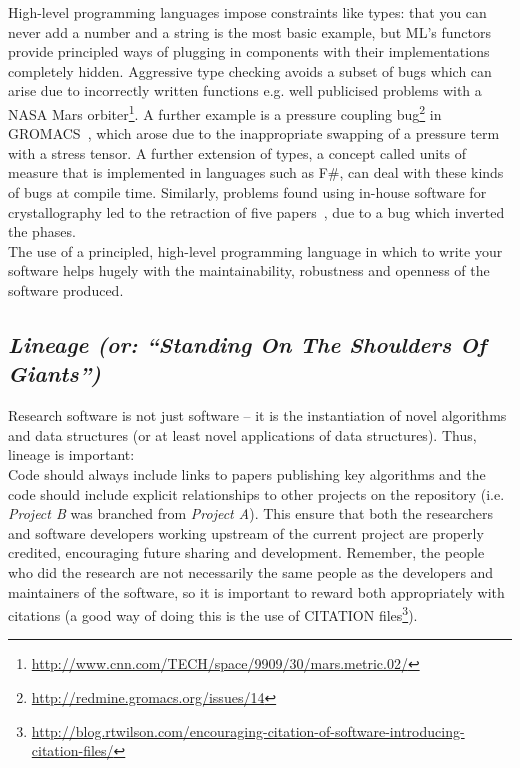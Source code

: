 \documentclass[a4paper,11pt]{article}
\begin{document}
High-level programming languages impose constraints like types: that
you can never add a number and a string is the most basic example, but
ML's functors provide principled ways of plugging in components with
their implementations completely hidden. Aggressive type checking
avoids a subset of bugs which can arise due to incorrectly written
functions e.g. well publicised problems with a NASA Mars
orbiter\footnote{\url{http://www.cnn.com/TECH/space/9909/30/mars.metric.02/}}.
A further example is a pressure coupling
bug\footnote{\url{http://redmine.gromacs.org/issues/14}} in
GROMACS~\cite{Hess2008}, which arose due to the inappropriate swapping
of a pressure term with a stress tensor.  A further extension of
types, a concept called units of measure that is implemented in
languages such as F\#, can deal with these kinds of bugs at compile
time. Similarly, problems found using in-house software for
crystallography led to the retraction of five
papers~\cite{Miller2006}, due to a bug which inverted the phases.\\

 The use of a
principled, high-level programming language in which to write your
software helps hugely with the maintainability, robustness and
openness of the software produced.

\subsection{{\emph{Lineage (or: ``Standing On The Shoulders Of Giants'')}}}

Research software is not just software -- it is the instantiation of
novel algorithms and data structures (or at least novel applications
of data structures). Thus, lineage is important:\\

 Code should always
include links to papers publishing key algorithms and the code should
include explicit relationships to other projects on the repository
(i.e. {\emph{Project B}} was branched from {\emph{Project A}}). This
ensure that both the researchers and software developers working
upstream of the current project are properly credited, encouraging
future sharing and development. Remember, the people who did the
research are not necessarily the same people as the developers and
maintainers of the software, so it is important to reward both
appropriately with citations (a good way of doing this is the use of
CITATION
files\footnote{\url{http://blog.rtwilson.com/encouraging-citation-of-software-introducing-citation-files/}}).
\end{document}
